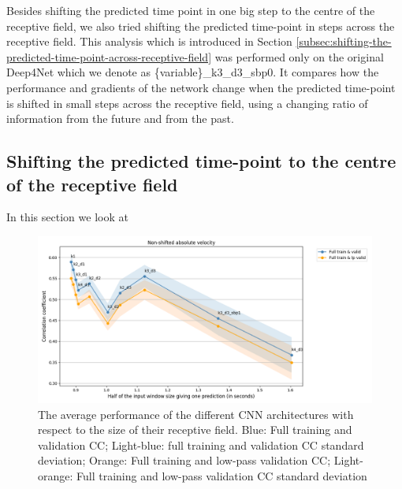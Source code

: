 Besides shifting the predicted time point in one big step to the centre of the receptive field, we also tried shifting the predicted time-point in steps across the receptive field.
This analysis which is introduced in Section \ref{subsec:shifting-the-predicted-time-point-across-receptive-field} was performed only on the original Deep4Net which we denote as \{variable\}\_k3\_d3\_sbp0.
It compares how the performance and gradients of the network change when the predicted time-point is shifted in small steps across the receptive field, using a changing ratio of information from the future and from the past.

\subsection{Shifting the predicted time-point to the centre of the receptive field}\label{subsec:shifting-the-predicted-time-point-to-the-centre-of-the-receptive-field}
In this section we look at 

\begin{figure}[!htbp]
\centering
   \includegraphics[width=1\linewidth]{img/ch4/distance-shifted-performance-absVel}
   \caption[Dependence of performance on receptive field size]{The average performance of the different CNN architectures with respect to the size of their receptive field. Blue: Full training and validation CC; Light-blue: full training and validation CC standard deviation; Orange: Full training and low-pass validation CC; Light-orange: Full training and low-pass validation CC standard deviation}
   \label{fig:figure-distance}
\end{figure}


